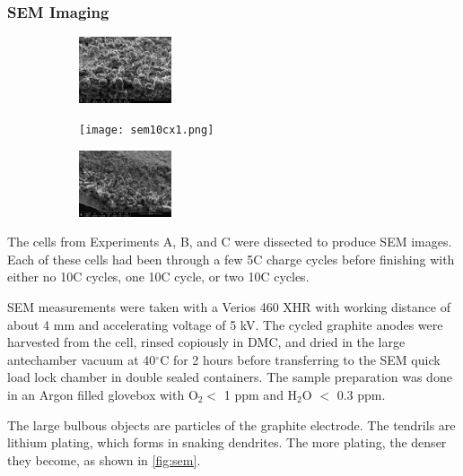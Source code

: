 \subsubsection{SEM Imaging}
\begin{figure}[t!]\label{fig:sem}
\centering
\caption{SEM images of cells after experiencing a few 5C cycles and either zero (left), one (center), or two (right) 10C cycles.}
     \begin{subfigure}
         \centering
         \includegraphics[width=0.3\textwidth]{sem5c.png}
     \end{subfigure}
     \hfill
     \begin{subfigure}
         \centering
         \texttt{[image: sem10cx1.png]}
     \end{subfigure}
     \hfill
     \begin{subfigure}
         \centering
         \includegraphics[width=0.3\textwidth]{sem10cx2.png}
     \end{subfigure}
\end{figure}

The cells from Experiments A, B, and C were dissected to produce SEM images. Each of these cells had been through a few 5C charge cycles before finishing with either no 10C cycles, one 10C cycle, or two 10C cycles. 

SEM measurements were taken with a Verios 460 XHR with working distance of about 4 mm and accelerating voltage of 5 kV. The cycled graphite anodes were harvested from the cell, rinsed copiously in DMC, and dried in the large antechamber vacuum at 40$^{\circ}$C for 2 hours before transferring to the SEM quick load lock chamber in double sealed containers. The sample preparation was done in an Argon filled glovebox with O$_2 <$ 1 ppm and H$_2$O $<$ 0.3 ppm.

The large bulbous objects are particles of the graphite electrode. The tendrils are lithium plating, which forms in snaking dendrites. 
The more plating, the denser they become, as shown in \hyperref[fig:sem]{\cref{fig:sem}}.  

